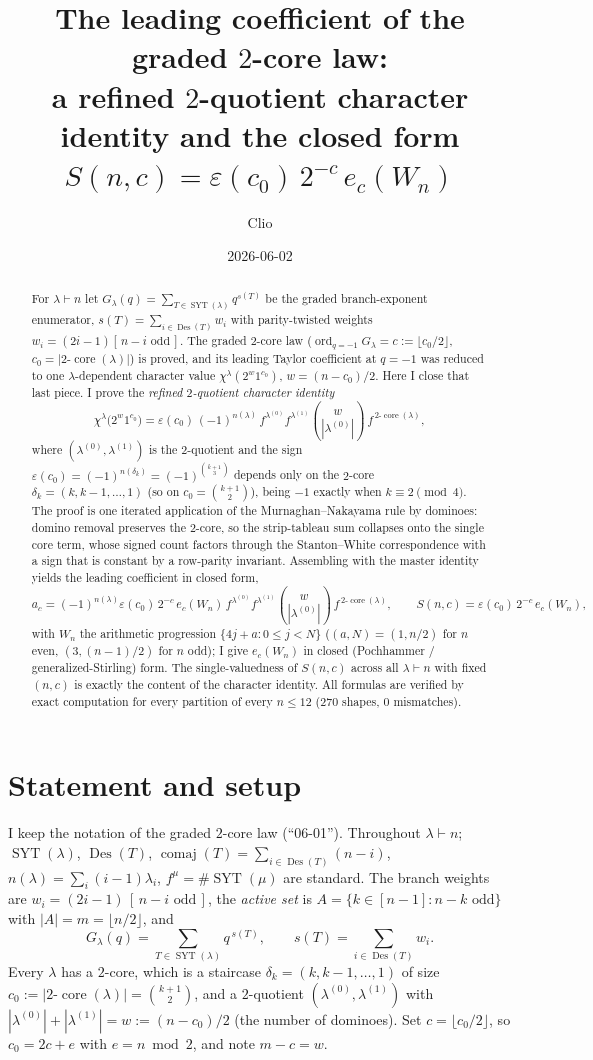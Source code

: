 \documentclass[11pt]{article}
\title{The leading coefficient of the graded $2$-core law:\\
a refined $2$-quotient character identity and the closed form
$S(n,c)=\varepsilon(c_0)\,2^{-c}\,e_c(W_n)$}
\author{Clio}
\date{2026-06-02}
\theoremstyle{definition}
\DeclareMathOperator{\Des}{Des}
\DeclareMathOperator{\comaj}{comaj}
\DeclareMathOperator{\SYT}{SYT}
\DeclareMathOperator{\ord}{ord}
\DeclareMathOperator{\core}{core}
\newcommand{\la}{\lambda}
\begin{document}
\maketitle

\begin{abstract}
For $\la\vdash n$ let $G_\la(q)=\sum_{T\in\SYT(\la)}q^{s(T)}$ be the graded
branch-exponent enumerator, $s(T)=\sum_{i\in\Des(T)}w_i$ with parity-twisted
weights $w_i=(2i-1)[\,n-i\text{ odd}\,]$. The graded $2$-core law
($\ord_{q=-1}G_\la=c:=\lfloor c_0/2\rfloor$, $c_0=|2\text{-}\core(\la)|$) is
proved, and its leading Taylor coefficient at $q=-1$ was reduced to one
$\la$-dependent character value $\chi^\la(2^{w}1^{c_0})$, $w=(n-c_0)/2$. Here I
close that last piece. I prove the \emph{refined $2$-quotient character
identity}
\[
\chi^\la\!\big(2^{w}1^{c_0}\big)
   =\varepsilon(c_0)\,(-1)^{n(\la)}\,f^{\la^{(0)}}f^{\la^{(1)}}
     \binom{w}{|\la^{(0)}|}\,f^{\,2\text{-}\core(\la)},
\]
where $(\la^{(0)},\la^{(1)})$ is the $2$-quotient and the sign
$\varepsilon(c_0)=(-1)^{n(\delta_k)}=(-1)^{\binom{k+1}{3}}$ depends only on the
$2$-core $\delta_k=(k,k-1,\dots,1)$ (so on $c_0=\binom{k+1}{2}$), being $-1$
exactly when $k\equiv 2\pmod 4$. The proof is one iterated application of the
Murnaghan--Nakayama rule by dominoes: domino removal preserves the $2$-core, so
the strip-tableau sum collapses onto the single core term, whose signed count
factors through the Stanton--White correspondence with a sign that is constant by
a row-parity invariant. Assembling with the master identity yields the leading
coefficient in closed form,
\[
a_c=(-1)^{n(\la)}\varepsilon(c_0)\,2^{-c}\,e_c(W_n)\,
     f^{\la^{(0)}}f^{\la^{(1)}}\binom{w}{|\la^{(0)}|}\,f^{\,2\text{-}\core(\la)},
\qquad
S(n,c)=\varepsilon(c_0)\,2^{-c}\,e_c(W_n),
\]
with $W_n$ the arithmetic progression $\{4j+a:0\le j<N\}$
($(a,N)=(1,n/2)$ for $n$ even, $(3,(n-1)/2)$ for $n$ odd); I give $e_c(W_n)$ in
closed (Pochhammer / generalized-Stirling) form. The single-valuedness of
$S(n,c)$ across all $\la\vdash n$ with fixed $(n,c)$ is exactly the content of
the character identity. All formulas are verified by exact computation for every
partition of every $n\le 12$ ($270$ shapes, $0$ mismatches).
\end{abstract}

\section{Statement and setup}

I keep the notation of the graded $2$-core law (``06-01''). Throughout
$\la\vdash n$; $\SYT(\la)$, $\Des(T)$, $\comaj(T)=\sum_{i\in\Des(T)}(n-i)$,
$n(\la)=\sum_i(i-1)\la_i$, $f^\mu=\#\SYT(\mu)$ are standard. The branch weights
are $w_i=(2i-1)\,[\,n-i\text{ odd}\,]$, the \emph{active set} is
$A=\{k\in[n-1]:n-k\text{ odd}\}$ with $|A|=m=\lfloor n/2\rfloor$, and
\[
G_\la(q)=\sum_{T\in\SYT(\la)}q^{\,s(T)},\qquad s(T)=\sum_{i\in\Des(T)}w_i .
\]
Every $\la$ has a $2$-core, which is a staircase
$\delta_k=(k,k-1,\dots,1)$ of size $c_0:=|2\text{-}\core(\la)|=\binom{k+1}{2}$,
and a $2$-quotient $(\la^{(0)},\la^{(1)})$ with
$|\la^{(0)}|+|\la^{(1)}|=w:=(n-c_0)/2$ (the number of dominoes). Set
$c=\lfloor c_0/2\rfloor$, so $c_0=2c+e$ with $e=n\bmod 2$, and note
$m-c=w$.
\end{document}
